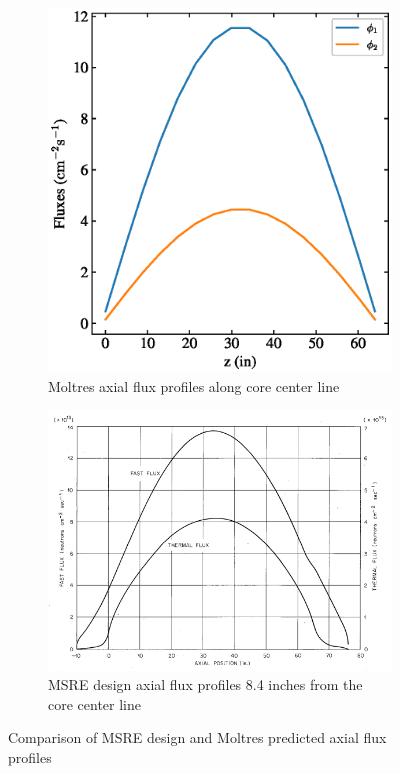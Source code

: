 \documentclass{article}
\makeatletter
\def\maxwidth#1{\ifdim\Gin@nat@width>#1 #1\else\Gin@nat@width\fi}
\makeatother
\begin{document}
\begin{figure}[htpb]
    \centering
    \begin{subfigure}[b]{.5\textwidth}
      \includegraphics[width=\maxwidth{\textwidth}]{moltres_axial_fluxes.eps}
      \caption{Moltres axial flux profiles along core center line}
      \label{fig:moltres_axial_fluxes}
    \end{subfigure}
    \begin{subfigure}[b]{.5\textwidth}
      \includegraphics[width=\maxwidth{\textwidth}]{msre_axial_fluxes.png}
      \caption{\gls{MSRE} design axial flux profiles 8.4 inches from the core
        center line \cite{briggs_molten-salt_1964}}
      \label{fig:msre_axial_fluxes}
    \end{subfigure}
    \caption{Comparison of \gls{MSRE} design and Moltres predicted axial
      flux profiles}
    \label{fig:axial_fluxes_compare}
\end{figure}
\end{document}
